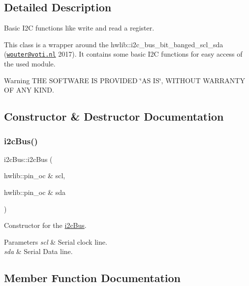 \subsection{Detailed Description}
Basic I2C functions like write and read a register. 

This class is a wrapper around the hwlib\+::i2c\+\_\+bus\+\_\+bit\+\_\+banged\+\_\+scl\+\_\+sda (\href{mailto:wouter@voti.nl}{\tt wouter@voti.\+nl} 2017). It contains some basic I2C functions for easy access of the used module. \begin{DoxyWarning}{Warning}
T\+HE S\+O\+F\+T\+W\+A\+RE IS P\+R\+O\+V\+I\+D\+ED \char`\"{}\+A\+S I\+S\char`\"{}, W\+I\+T\+H\+O\+UT W\+A\+R\+R\+A\+N\+TY OF A\+NY K\+I\+ND. 
\end{DoxyWarning}


\subsection{Constructor \& Destructor Documentation}
\mbox{\label{classi2c_bus_aa2f1a1a391410e33dc4f09c6f5b9ae7c}} 
\subsubsection{\texorpdfstring{i2c\+Bus()}{i2cBus()}}
{\footnotesize\ttfamily i2c\+Bus\+::i2c\+Bus (\begin{DoxyParamCaption}\item[{hwlib\+::pin\+\_\+oc \&}]{scl,  }\item[{hwlib\+::pin\+\_\+oc \&}]{sda }\end{DoxyParamCaption})}



Constructor for the \mbox{\hyperlink{classi2c_bus}{i2c\+Bus}}. 


\begin{DoxyParams}{Parameters}
{\em scl} & Serial clock line. \\
\hline
{\em sda} & Serial Data line. \\
\hline
\end{DoxyParams}


\subsection{Member Function Documentation}
\mbox{\label{classi2c_bus_a30c140f08712618bc46f7c98ba1da3c3}} 
